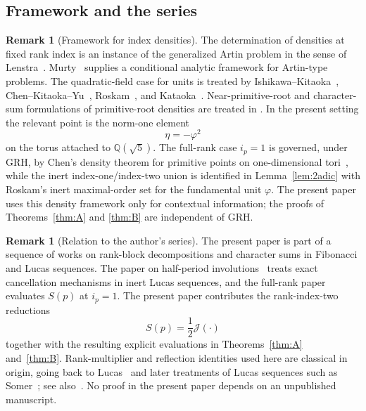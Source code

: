 \documentclass[11pt]{amsart}
\theoremstyle{plain}
\theoremstyle{definition}
\newtheorem{remark}[theorem]{Remark}
\newcommand{\Jac}{\mathcal{J}}
\begin{document}
\subsection{Framework and the series}

\begin{remark}[Framework for index densities]
The determination of densities at fixed rank index is an instance of
the generalized Artin problem in the sense of
Lenstra~\cite{Lenstra1977}.  Murty~\cite{Murty1983} supplies a
conditional analytic framework for Artin-type problems.  The
quadratic-field case for units is treated by
Ishikawa--Kitaoka~\cite{IshikawaKitaoka1998},
Chen--Kitaoka--Yu~\cite{ChenKitaokaYu2000},
Roskam~\cite{Roskam2000,Roskam2002}, and
Kataoka~\cite{Kataoka2001,Kataoka2003}.  Near-primitive-root and
character-sum formulations of primitive-root densities are treated in
\cite{LenstraMoreeStevenhagen2014,Palenstijn2014}.  In the present
setting the relevant point is the norm-one element
\[
  \eta=-\varphi^{2}
\]
on the torus attached to \(\mathbb Q(\sqrt5)\).  The full-rank case
\(i_p=1\) is governed, under GRH, by Chen's density theorem for
primitive points on one-dimensional tori~\cite{Chen2002}, while the
inert index-one/index-two union is identified in Lemma~\ref{lem:2adic}
with Roskam's inert maximal-order set for the fundamental unit
\(\varphi\).  The present paper uses this density framework only for
contextual information; the proofs of Theorems~\ref{thm:A} and
\ref{thm:B} are independent of GRH.
\end{remark}

\begin{remark}[Relation to the author's series]
The present paper is part of a sequence of works on rank-block
decompositions and character sums in Fibonacci and Lucas sequences.
The paper on half-period involutions~\cite{Ghandali2026HalfPeriod} treats exact
cancellation mechanisms in inert Lucas sequences, and the full-rank
paper~\cite{Ghandali2026Preprint} evaluates \(S(p)\) at \(i_p=1\).  The present paper
contributes the rank-index-two reductions
\[
  S(p)=\frac12\Jac(\cdot)
\]
together with the resulting explicit evaluations in
Theorems~\ref{thm:A} and~\ref{thm:B}.  Rank-multiplier and reflection
identities used here are classical in origin, going back to
Lucas~\cite{Lucas1878} and later treatments of Lucas sequences such as
Somer~\cite{Somer1980}; see also~\cite{Ghandali2026HalfPeriod}.  No proof in the present
paper depends on an unpublished manuscript.
\end{remark}
\end{document}

